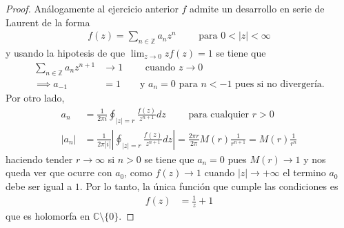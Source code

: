 \documentclass{article}
\newcommand{\Z}{\mathbb{Z}}
\newcommand{\C}{\mathbb{C}}
\begin{document}
\begin{proof}
    Análogamente al ejercicio anterior \( f \) admite un desarrollo en serie de Laurent de la forma \begin{align*}
        f(z) = \sum_{n \in \Z} a_n z^n \qquad \text{ para } 0 < |z| < \infty
    \end{align*}
    y usando la hipotesis de que \( \lim_{z \to 0} z f(z) = 1 \) se tiene que \begin{align*}
        \sum_{n \in \Z} a_n z^{n+1} & \to 1 \qquad \text{ cuando } z \to 0                                             \\
        \implies a_{-1}             & = 1 \qquad \text{y } a_n = 0 \text{ para } n < -1 \text{ pues si no divergería.}
    \end{align*}
    Por otro lado, \begin{align*}
        a_n   & = \frac{1}{2 \pi i } \oint_{|z| = r} \frac{f(z)}{z^{n+1}} dz \qquad \text{ para cualquier } r > 0                                              \\
        |a_n| & = \frac{1}{2 \pi |i|} \left| \oint_{|z|=r} \frac{f(z)}{z^{n+1}} dz \right| = \frac{2 \pi r}{2 \pi} M(r) \frac{1}{r^{n+1}} = M(r) \frac{1}{r^n}
    \end{align*}
    haciendo tender \( r \to \infty \) si \( n > 0 \) se tiene que \( a_n = 0 \) pues \( M(r) \to 1 \) y nos queda ver que ocurre con \( a_0 \), como \( f(z) \to 1 \) cuando \( |z| \to +\infty \) el termino \( a_0 \) debe ser igual a \( 1 \).
    Por lo tanto, la única función que cumple las condiciones es \begin{align*}
        f(z) & = \frac{1}{z} + 1
    \end{align*}
    que es holomorfa en \( \C \setminus \{ 0 \} \).
\end{proof}
\end{document}
